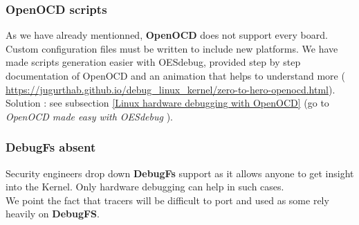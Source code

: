 \subsubsection{OpenOCD scripts}
As we have already mentionned, \textbf{OpenOCD} does not support every board. Custom configuration files must be written to include new platforms. We have made scripts generation easier with OESdebug, provided step by step documentation of OpenOCD and an animation that helps to understand more ({\color{blue} \url{https://jugurthab.github.io/debug_linux_kernel/zero-to-hero-openocd.html}}).\\

{\color{orange}Solution : } see {\color{red}subsection {\color{blue}\ref{Linux hardware debugging with OpenOCD}}} (go to \og \textit{OpenOCD made easy with OESdebug} \fg).


\subsubsection{DebugFs absent}
Security engineers drop down \textbf{DebugFs} support as it allows anyone to get insight into the Kernel. Only hardware debugging can help in such cases.\\
We point the fact that tracers will be difficult to port and used as some rely heavily on \textbf{DebugFS}.
